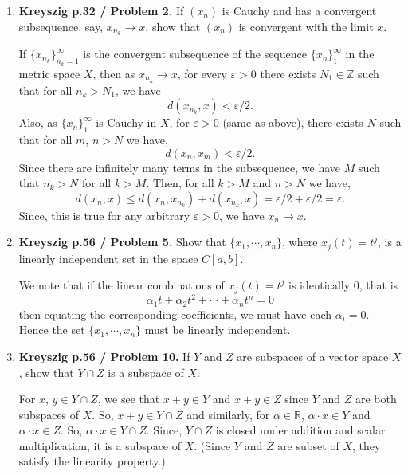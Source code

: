 \documentclass[12pt]{article}
\newcommand{\rl}{\mathbb{R}}
\begin{document}
\begin{enumerate}
 
\item {\bf Kreyszig p.32 / Problem 2.}
    If $(x_n)$ is Cauchy and has a convergent
    subsequence, say, $x_{n_k} \to x$, show that
    $(x_n)$ is convergent with the limit $x$. 
\begin{mybox}

    If $\{x_{n_k}\}_{n_k=1}^\infty$ is the convergent
    subsequence of the sequence $\{x_n\}_1^\infty$
    in the metric space $X$, then as $x_{n_k}\to x$,
    for every $\varepsilon>0$ there exists $N_1\in\mathbb{Z}$
    such that for all $n_k>N_1$, we have 
    $$d(x_{n_k},x)<\varepsilon/2.$$
    Also, as $\{x_n\}_1^\infty$ is Cauchy in $X$, for
    $\varepsilon>0$ (same as above), there exists $N$ such
    that for all $m$, $n>N$ we have, 
    $$d(x_n,x_m)<\varepsilon/2.$$
    Since there are infinitely many terms in the
    subsequence, we have $M$ such that $n_k>N$ for all $k>M$.
    Then, for all $k>M$ and $n>N$ we have,
    $$d(x_n,x)\leq d(x_n,x_{n_k})+d(x_{n_k},x)=\varepsilon
    /2+\varepsilon/2=\varepsilon.$$
    Since, this is true for any arbitrary $\varepsilon>0$,
    we have $x_n\to x$.
\end{mybox}

\item \textbf{Kreyszig p.56 / Problem 5.}
    Show that $\{x_1, \cdots, x_n \}$, where
    $x_j(t) = t^j$, is a linearly independent set
    in the space $C[a,b]$.
\begin{mybox}

    We note that if the linear combinations of
    $x_j(t) = t^j$ is identically 0, that is
    $$\alpha_1 t+\alpha_2 t^2+\cdots +\alpha_n
    t^n=0$$
    then equating the corresponding coefficients, we
    must have each $\alpha_i=0$. Hence the set
    $\{x_1, \cdots, x_n \}$ must be linearly independent.
\end{mybox}
 
\item \textbf{Kreyszig p.56 / Problem 10.}
    If $Y$ and $Z$ are subspaces of a vector space
    $X$, show that $Y \cap Z$ is a subspace of $X$.
\begin{mybox}
    
    For $x$, $y\in Y\cap Z$, we see that $x+y\in Y$
    and $x+y\in Z$ since $Y$ and $Z$ are both subspaces
    of $X$. So, $x+y\in Y\cap Z$ and similarly, for
    $\alpha\in \rl$, $\alpha \cdot x\in Y$ and
    $\alpha\cdot x\in Z$. So, $\alpha\cdot x\in Y\cap Z$.
    Since, $Y\cap Z$ is closed under addition and scalar
    multiplication, it is a subspace of $X$. (Since
    $Y$ and $Z$ are subset of $X$, they satisfy the
    linearity property.)
\end{mybox}
 

\end{enumerate}
\end{document}
